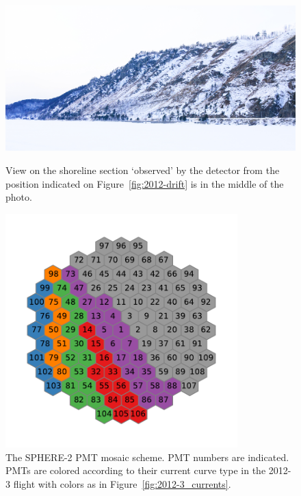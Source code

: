 \documentclass[universe,article,submit,moreauthors,pdftex]{Definitions/mdpi}
\begin{document}
\begin{paracol}{2}
\begin{figure}[tbh]
    \begin{minipage}[t]{0.58\textwidth}
        \centering
        \includegraphics[width=\textwidth]{DSC_7256_1.jpg}
        \caption{View on the shoreline section `observed' by the detector from the position indicated on Figure~\ref{fig:2012-drift} is in the middle of the photo.}
        \label{fig:2012--shore-view}
    \end{minipage}
    \hfill
    \begin{minipage}[t]{0.4\textwidth}
        \centering
        \includegraphics[width=0.8\textwidth]{2012-3_retina_all.pdf}
        \caption{The SPHERE-2 PMT mosaic scheme. PMT numbers are indicated. PMTs are colored according to their current curve type in the 2012-3 flight with colors as in Figure~\ref{fig:2012-3_currents}.}
        \label{fig:2012-3_shore_image}
    \end{minipage}
\end{figure}



\end{paracol}
\end{document}
